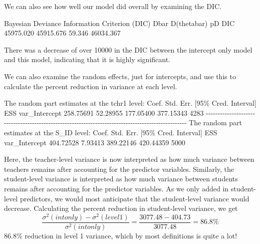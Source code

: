 \documentclass[
]{book}
\newenvironment{Shaded}{\begin{snugshade}}{\end{snugshade}}
\newcommand{\DecValTok}[1]{\textcolor[rgb]{0.00,0.00,0.81}{#1}}
\newcommand{\FloatTok}[1]{\textcolor[rgb]{0.00,0.00,0.81}{#1}}
\newcommand{\FunctionTok}[1]{\textcolor[rgb]{0.00,0.00,0.00}{#1}}
\newcommand{\NormalTok}[1]{#1}
\newcommand{\SpecialCharTok}[1]{\textcolor[rgb]{0.00,0.00,0.00}{#1}}
\begin{document}
We can also see how well our model did overall by examining the DIC.

\begin{Shaded}
\begin{Highlighting}[]
\NormalTok{Bayesian Deviance Information }\FunctionTok{Criterion}\NormalTok{ (DIC)}
\NormalTok{Dbar      }\FunctionTok{D}\NormalTok{(thetabar)    pD      DIC}
\FloatTok{45975.020}  \FloatTok{45915.676}  \FloatTok{59.346}     \FloatTok{46034.367}  
\end{Highlighting}
\end{Shaded}

There was a decrease of over 10000 in the DIC between the intercept only model and this model, indicating that it is highly significant.

We can also examine the random effects, just for intercepts, and use this to calculate the percent reduction in variance at each level.

\begin{Shaded}
\begin{Highlighting}[]
\NormalTok{The random part estimates at the tchr1 level}\SpecialCharTok{:} 
\NormalTok{                    Coef.   Std. Err.   [}\DecValTok{95}\NormalTok{\% Cred.   Interval]    ESS }
\NormalTok{var\_Intercept   }\FloatTok{258.75691}    \FloatTok{52.28955}    \FloatTok{177.05400}   \FloatTok{377.15343}   \DecValTok{4283} 
\SpecialCharTok{{-}{-}{-}{-}{-}{-}{-}{-}{-}{-}{-}{-}{-}{-}{-}{-}{-}{-}{-}{-}{-}{-}{-}{-}{-}{-}{-}{-}{-}{-}{-}{-}{-}{-}{-}{-}{-}{-}{-}{-}{-}{-}{-}{-}{-}{-}{-}{-}{-}{-}{-}{-}{-}{-}{-}{-}{-}{-}{-}{-}{-}{-}{-}{-}{-}{-}{-}{-}{-}{-}{-}{-}{-}{-}{-}{-}{-}{-}{-}{-}{-}{-}{-}{-}{-}{-}{-}{-}{-}{-}{-}{-}{-}{-}{-}{-}{-}{-}{-}} 
\NormalTok{The random part estimates at the S\_ID level}\SpecialCharTok{:} 
\NormalTok{                    Coef.   Std. Err.   [}\DecValTok{95}\NormalTok{\% Cred.   Interval]    ESS }
\NormalTok{var\_Intercept   }\FloatTok{404.72528}     \FloatTok{7.93413}    \FloatTok{389.22146}   \FloatTok{420.44359}   \DecValTok{5000}  
\end{Highlighting}
\end{Shaded}

Here, the teacher-level variance is now interpreted as how much variance between teachers remains after accounting for the predictor variables. Similarly, the student-level variance is interpreted as how much variance between students remains after accounting for the predictor variables. As we only added in student-level predictors, we would most anticipate that the student-level variance would decrease. Calculating the percent reduction in student-level variance, we get
\[\frac{\sigma^{2}(intonly) - \sigma^{2}(level1)}{\sigma^{2}(intonly)} = \frac{3077.48-404.73}{3077.48} = 86.8\%\]
86.8\% reduction in level 1 variance, which by most definitions is quite a lot!
\end{document}
